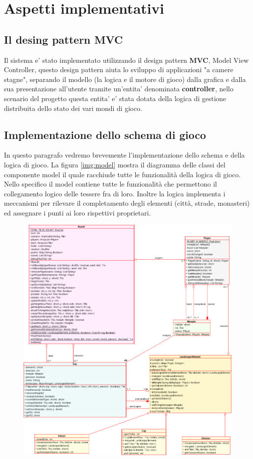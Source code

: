\section{Aspetti implementativi}



\subsection{Il desing pattern MVC}
Il sistema e' stato implementato utilizzando il design pattern \textbf{MVC},
Model View Controller, questo design pattern aiuta lo sviluppo di applicazioni
"a camere stagne", separando il modello (la logica e il motore di gioco) dalla
grafica e dalla sua presentazione all'utente tramite un'entita' denominata
\textbf{controller}, nello scenario del progetto questa entita' e' stata
dotata della logica di gestione distribuita dello stato dei vari mondi di gioco.

\subsection{Implementazione dello schema di gioco}


In questo paragrafo vedremo brevemente l'implementazione dello schema e
della logica di gioco.
La figura \ref{img:model} mostra il diagramma delle classi del
componente model il quale racchiude tutte le funzionalità della logica
di gioco.\\
Nello specifico il model contiene tutte le funzionalità che permettono
il collegamento logico delle tessere fra di loro. 
Inoltre la logica implementa i meccanismi per rilevare il completamento degli elementi
(città, strade, monasteri) ed assegnare i punti ai loro rispettivi
proprietari.
\begin{figure}
\includegraphics[width=\textwidth]{img/modelClassDiagram.png}
\end{figure}


